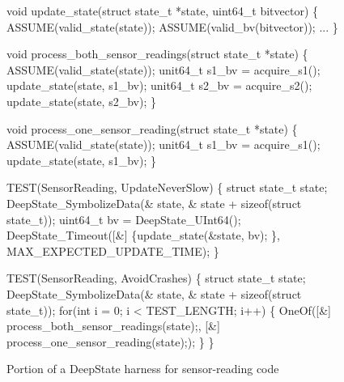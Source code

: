 \begin{figure}[t]
  {\scriptsize
  \begin{code}

void update\_state(struct state\_t *state, uint64\_t bitvector) \{
  ASSUME(valid\_state(state));
  ASSUME(valid\_bv(bitvector));
  ...
\}

void process\_both\_sensor\_readings(struct state\_t *state) \{
  ASSUME(valid\_state(state)); 
  unit64\_t s1\_bv = acquire\_s1(); 
  update\_state(state, s1\_bv); 
  unit64\_t s2\_bv = acquire\_s2(); 
  update\_state(state, s2\_bv);  
\}
  
void process\_one\_sensor\_reading(struct state\_t *state) \{
  ASSUME(valid\_state(state)); 
  unit64\_t s1\_bv = acquire\_s1(); 
  update\_state(state, s1\_bv); 
\}

TEST(SensorReading, UpdateNeverSlow) \{
  struct state\_t state;
  DeepState\_SymbolizeData(\& state, \& state + sizeof(struct state\_t));
  uint64\_t bv = DeepState\_UInt64();
  DeepState\_Timeout([\&] \{update\_state(\&state, bv); \}, MAX\_EXPECTED\_UPDATE\_TIME);
\}

TEST(SensorReading, AvoidCrashes) \{
  struct state\_t state;
  DeepState\_SymbolizeData(\& state, \& state + sizeof(struct state\_t));
  for(int i = 0; i < TEST\_LENGTH; i++) \{
      OneOf([\&] {process\_both\_sensor\_readings(state);},
        [\&] {process\_one\_sensor\_reading(state);});
  \}
\} 
\end{code}
}
  \caption{Portion of a DeepState harness for sensor-reading code}
  \label{fig:assumption}
  \end{figure}

